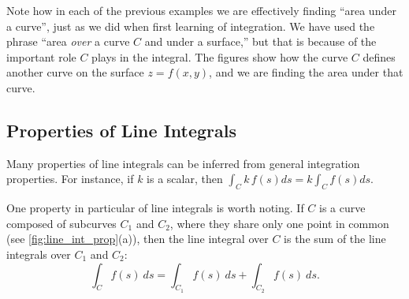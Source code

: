Note how in each of the previous examples we are effectively finding ``area under a curve'', just as we did when first learning of integration. We have used the phrase ``area \emph{over} a curve $C$ and under a surface,'' but that is because of the important role $C$ plays in the integral. The figures show how the curve $C$ defines another curve on the surface $z=f(x,y)$, and we are finding the area under that curve.

\subsection{Properties of Line Integrals}

Many properties of line integrals can be inferred from general integration properties. For instance, if $k$ is a scalar, then $\int_C k\,f(s)ds = k\int_Cf(s)ds$.

One property in particular of line integrals is worth noting. If $C$ is a curve composed of subcurves $C_1$ and $C_2$, where they share only one point in common (see \autoref{fig:line_int_prop}(a)), then the line integral over $C$ is the sum of the line integrals over $C_1$ and $C_2$: 
\[\int_Cf(s)\ ds = \int_{C_1}f(s)\ ds+\int_{C_2}f(s)\ ds.\]

